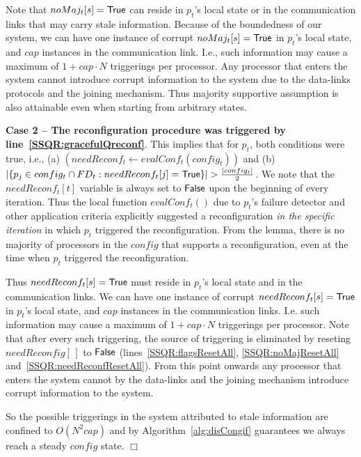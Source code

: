 \documentclass[11pt]{article}
\newcommand{\assert}{lemma}
\newenvironment{proof}{\noindent{\bf Proof.}}{\hfill$\Box$}
\begin{document}
\begin{proof}
Note that $noMaj_t[s] = \sf True$ can reside in $p_t$'s local state or in the communication links that may carry stale information. 
Because of the boundedness of our system, we can have one instance of corrupt $noMaj_t[s] = \sf True$ in $p_t$'s local state, and $cap$ instances in the communication link.
I.e., such information may cause a maximum of $1+cap\cdot N$ triggerings per processor.
Any processor that enters the system cannot introduce corrupt information to the system due to the data-links protocols and the joining mechanism.
Thus majority supportive assumption is also attainable even when starting from arbitrary states.





\noindent \textbf{Case 2 -- The reconfiguration procedure was triggered by line~\ref{SSQR:gracefulQreconf}}.
This implies that for $p_t$, both conditions were true, i.e., (a) $(needReconf_t \gets evalConf_t(config_t))$ and (b) $|\{p_j \in config_t\cap FD_t: needReconf_t[j] = {\sf True}\}| >\frac{|config_t|}{2}$.
We note that the $needReconf_t[t]$ variable is always set to $\sf False$ upon the beginning of every iteration.
Thus the local function $evalConf_t()$ due to $p_t$'s failure detector and other application criteria explicitly suggested a reconfiguration \emph{in the specific iteration} in which $p_t$ triggered the reconfiguration.
From the \assert, there is no majority of processors in the $config$ that supports a reconfiguration, even at the time when $p_t$ triggered the reconfiguration.


Thus $needReconf_t[s] = \sf True$ must reside in $p_t$'s local state and in the communication links. 
We can have one instance of corrupt $needReconf_t[s] = \sf True$ in $p_t$'s local state, and $cap$ instances in the communication links.
I.e. such information may cause a maximum of $1+cap\cdot N$ triggerings per processor.
Note that after every such triggering, the source of triggering is eliminated by reseting $needReconfig[\,]$ to $\sf False$ (lines~\ref{SSQR:flagsResetAll}, \ref{SSQR:noMajResetAll} and~\ref{SSQR:needReconfResetAll}).
From this point onwards any processor that enters the system cannot by the data-links and the joining mechanism introduce corrupt information to the system.

So the possible triggerings in the system attributed to stale information are confined to $O(N^2cap)$ and by Algorithm~\ref{alg:disCongif} guarantees we always reach a steady $config$ state.
\end{proof}
\end{document}
